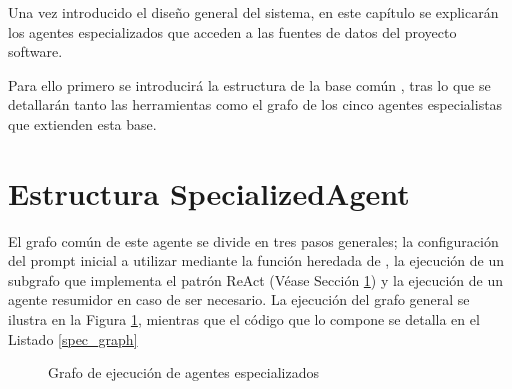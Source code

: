 Una vez introducido el diseño general del sistema, en este capítulo se explicarán los agentes especializados que acceden a las fuentes de datos del proyecto software. 

Para ello primero se introducirá la estructura de la base común , tras lo que se detallarán tanto las herramientas como el grafo de los cinco agentes especialistas que extienden esta base.

\section{Estructura SpecializedAgent}
El grafo común de este agente se divide en tres pasos generales; la configuración del prompt inicial a utilizar mediante la función  heredada de , la ejecución de un subgrafo que implementa el patrón ReAct (Véase Sección \ref{}) y la ejecución de un agente resumidor en caso de ser necesario. La ejecución del grafo general se ilustra en la Figura \ref{fig:specialized}, mientras que el código que lo compone se detalla en el Listado \ref{spec_graph} 


\begin{figure}[h]
  \centering
  \caption{Grafo de ejecución de agentes especializados}
  \label{fig:specialized}
\end{figure}

